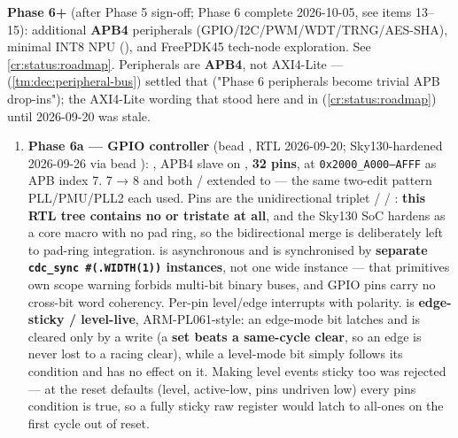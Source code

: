 \begin{record}
\textbf{Phase 6+} (after Phase 5 sign-off; Phase 6 complete 2026-10-05,
see items 13--15): additional \textbf{APB4} peripherals
(GPIO/\allowbreak{}I2C/\allowbreak{}PWM/\allowbreak{}WDT/\allowbreak{}TRNG/\allowbreak{}AES-SHA),
minimal INT8 NPU (), and FreePDK45 tech-node exploration.
See \cref{cr:status:roadmap}. \warn{} Peripherals are \textbf{APB4}, not
AXI4-Lite ---  (\cref{tm:dec:peripheral-bus}) settled that
("Phase 6 peripherals become trivial APB drop-ins"); the AXI4-Lite
wording that stood here and in  (\cref{cr:status:roadmap}) until
2026-09-20 was stale.

\begin{enumerate}
\def\labelenumi{\arabic{enumi}.}
\setcounter{enumi}{12}
\item
  \ok{} \textbf{Phase 6a --- GPIO controller} (bead , RTL
  2026-09-20; Sky130-hardened 2026-09-26 via bead ):
  , APB4 slave on
  , \textbf{32 pins}, at
  \texttt{0x2000\_\allowbreak{}A000–AFFF} as APB index 7.
   7 → 8 and both  /
   extended to  --- the same
  two-edit pattern PLL/\allowbreak{}PMU/\allowbreak{}PLL2 each used.
  Pins are the unidirectional triplet  /
   / : \textbf{this RTL tree contains no
   or tristate at all}, and the Sky130 SoC hardens as a core
  macro with no pad ring, so the bidirectional merge is deliberately
  left to pad-ring integration.  is asynchronous and is
  synchronised by \textbf{ separate
  \texttt{cdc\_\allowbreak{}sync\ \#(.\allowbreak{}WIDTH(1))}
  instances}, not one wide instance --- that primitive\textquotesingle s
  own scope warning forbids multi-bit binary buses, and GPIO pins carry
  no cross-bit word coherency. Per-pin level/\allowbreak{}edge
  interrupts with polarity.  is \textbf{edge-sticky
  / level-live}, ARM-PL061-style: an edge-mode bit latches and is
  cleared only by a  write (a \textbf{set beats a
  same-cycle clear}, so an edge is never lost to a racing clear), while
  a level-mode bit simply follows its condition and 
  has no effect on it. Making level events sticky too was rejected ---
  at the reset defaults (level, active-low, pins undriven low) every
  pin\textquotesingle s condition is true, so a fully sticky raw
  register would latch to all-ones on the first cycle out of reset.

\end{enumerate}
\end{record}
